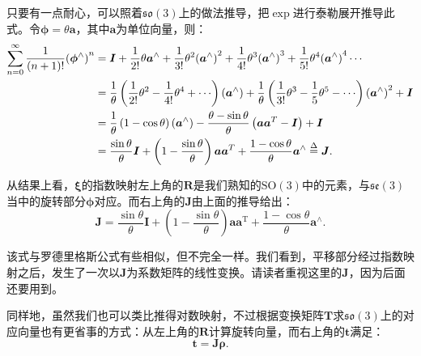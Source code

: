 只要有一点耐心，可以照着$\mathfrak{so}(3)$上的做法推导，把$\exp$进行泰勒展开推导此式。令$\boldsymbol{\phi}=\theta \bm{a}$，其中$\bm{a}$为单位向量，则：
\begin{equation}
	\begin{aligned}
		\sum\limits_{n = 0}^\infty  {\frac{1}{{\left( {n + 1} \right)!}}{{\left( {{\boldsymbol{\phi} ^ \wedge }} \right)}^n}} &= \bm{I} + \frac{1}{{2!}}\theta {\bm{a}^ \wedge } + \frac{1}{{3!}}{\theta ^2}{\left( {{\bm{a}^ \wedge }} \right)^2} + \frac{1}{{4!}}{\theta ^3}{\left( {{\bm{a}^ \wedge }} \right)^3} + \frac{1}{{5!}}{\theta ^4}{\left( {{\bm{a}^ \wedge }} \right)^4} \cdots \\
		&= \frac{1}{\theta }\left( {\frac{1}{{2!}}{\theta ^2} - \frac{1}{{4!}}{\theta ^4} +  \cdots } \right)\left( {{\bm{a}^ \wedge }} \right) + \frac{1}{\theta }\left( {\frac{1}{{3!}}{\theta ^3} - \frac{1}{5}{\theta ^5} -  \cdots } \right){\left( {{\bm{a}^ \wedge }} \right)^2} + \bm{I}\\
		&= \frac{1}{\theta }\left( {1 - \cos \theta } \right)\left( {{\bm{a}^ \wedge }} \right) - \frac{{\theta  - \sin \theta }}{\theta }\left( {\bm{a}{\bm{a}^T} - \bm{I}} \right) + \bm{I}\\
		&= \frac{{\sin \theta }}{\theta }\bm{I} + \left( {1 - \frac{{\sin \theta }}{\theta }} \right)\bm{a}{\bm{a}^T} + \frac{{1 - \cos \theta }}{\theta }{\bm{a}^ \wedge } \buildrel \Delta \over = \bm{J}.
	\end{aligned}
\end{equation}

从结果上看，$\bm{\xi}$的指数映射左上角的$\bm{R}$是我们熟知的$\mathrm{SO}(3)$中的元素，与$\mathfrak{se}(3)$当中的旋转部分$\bm{\phi}$对应。而右上角的$\bm{J}$由上面的推导给出：
\begin{equation}
\label{eq:lieAlgebraJacobian}
\bm{J} = \frac{{\sin \theta }}{\theta } \bm{I} + \left( {1 - \frac{{\sin \theta }}{\theta }} \right) \bm{a} { \bm{a}^\mathrm{T}} + \frac{{1 - \cos \theta }}{\theta }{ \bm{a}^ \wedge }.
\end{equation}

该式与罗德里格斯公式有些相似，但不完全一样。我们看到，平移部分经过指数映射之后，发生了一次以$\bm{J}$为系数矩阵的线性变换。请读者重视这里的$\bm{J}$，因为后面还要用到。

同样地，虽然我们也可以类比推得对数映射，不过根据变换矩阵$\bm{T}$求$\mathfrak{so}(3)$上的对应向量也有更省事的方式：从左上角的$\bm{R}$计算旋转向量，而右上角的$\bm{t}$满足：
\begin{equation}
	\bm{t} = \bm{J} \bm{\rho}.
\end{equation}

